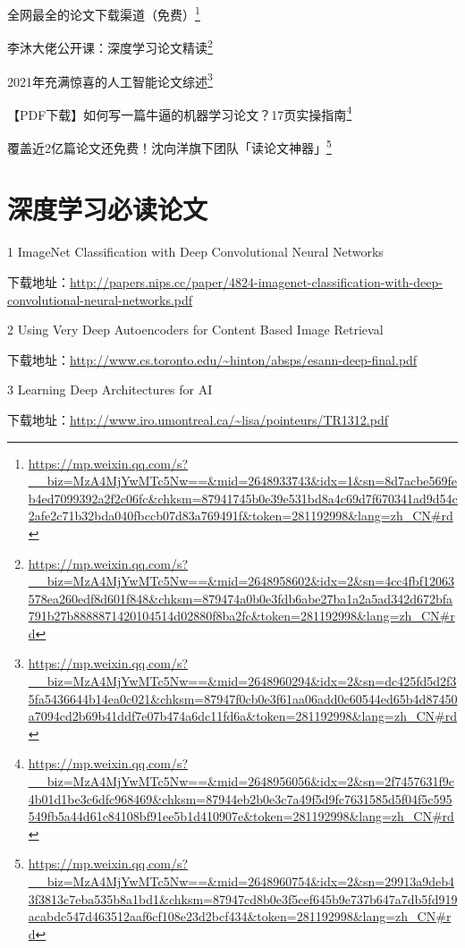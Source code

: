 \documentclass[]{ctexbook}
\renewcommand{\href}[2]{#2\footnote{\url{#1}}}
\begin{document}
\href{https://mp.weixin.qq.com/s?__biz=MzA4MjYwMTc5Nw==\&mid=2648933743\&idx=1\&sn=8d7acbe569feb4ed7099392a2f2c06fc\&chksm=87941745b0e39e531bd8a4c69d7f670341ad9d54c2afe2c71b32bda040fbccb07d83a769491f\&token=281192998\&lang=zh_CN\#rd}{全网最全的论文下载渠道（免费）}

\href{https://mp.weixin.qq.com/s?__biz=MzA4MjYwMTc5Nw==\&mid=2648958602\&idx=2\&sn=4cc4fbf12063578ea260edf8d601f848\&chksm=879474a0b0e3fdb6abe27ba1a2a5ad342d672bfa791b27b8888871420104514d02880f8ba2fc\&token=281192998\&lang=zh_CN\#rd}{李沐大佬公开课：深度学习论文精读}

\href{https://mp.weixin.qq.com/s?__biz=MzA4MjYwMTc5Nw==\&mid=2648960294\&idx=2\&sn=dc425fd5d2f35fa5436644b14ea0c021\&chksm=87947f0cb0e3f61aa06add0c60544ed65b4d87450a7094cd2b69b41ddf7e07b474a6dc11fd6a\&token=281192998\&lang=zh_CN\#rd}{2021年充满惊喜的人工智能论文综述}

\href{https://mp.weixin.qq.com/s?__biz=MzA4MjYwMTc5Nw==\&mid=2648956056\&idx=2\&sn=2f7457631f9c4b01d1be3c6dfc968469\&chksm=87944eb2b0e3c7a49f5d9fc7631585d5f04f5c595549fb5a44d61c84108bf91ee5b1d410907e\&token=281192998\&lang=zh_CN\#rd}{【PDF下载】如何写一篇牛逼的机器学习论文？17页实操指南}

\href{https://mp.weixin.qq.com/s?__biz=MzA4MjYwMTc5Nw==\&mid=2648960754\&idx=2\&sn=29913a9deb43f3813c7eba535b8a1bd1\&chksm=87947cd8b0e3f5cef645b9e737b647a7db5fd919acabdc547d463512aaf6cf108e23d2bcf434\&token=281192998\&lang=zh_CN\#rd}{覆盖近2亿篇论文还免费！沈向洋旗下团队「读论文神器」}

\hypertarget{ux6df1ux5ea6ux5b66ux4e60ux5fc5ux8bfbux8bbaux6587}{%
\section{深度学习必读论文}\label{ux6df1ux5ea6ux5b66ux4e60ux5fc5ux8bfbux8bbaux6587}}

1 ImageNet Classification with Deep Convolutional Neural Networks

下载地址：\url{http://papers.nips.cc/paper/4824-imagenet-classification-with-deep-convolutional-neural-networks.pdf}

2 Using Very Deep Autoencoders for Content Based Image Retrieval

下载地址：\url{http://www.cs.toronto.edu/~hinton/absps/esann-deep-final.pdf}

3 Learning Deep Architectures for AI

下载地址：\url{http://www.iro.umontreal.ca/~lisa/pointeurs/TR1312.pdf}
\end{document}
